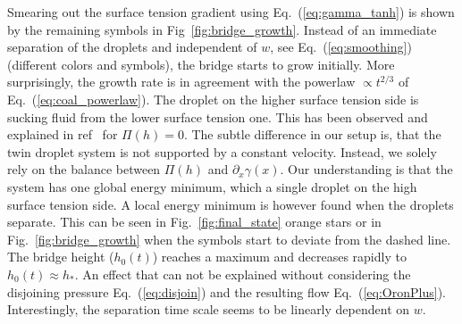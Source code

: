 \documentclass[twocolumn,amsmath,amssymb,showpacs,pre,nofootinbib,superscriptaddress]{revtex4-1} %
\begin{document}
Smearing out the surface tension gradient using Eq.~(\ref{eq:gamma_tanh}) is shown by the remaining symbols in Fig~\ref{fig:bridge_growth}.
Instead of an immediate separation of the droplets and independent of $w$, see Eq.~(\ref{eq:smoothing}) (different colors and symbols), the bridge starts to grow initially.
More surprisingly, the growth rate is in agreement with the powerlaw $\propto t^{2/3}$ of Eq.~(\ref{eq:coal_powerlaw}).
The droplet on the higher surface tension side is sucking fluid from the lower surface tension one.
This has been observed and explained in ref~\cite{PhysRevLett.109.066103} for $\Pi(h) = 0$.
The subtle difference in our setup is, that the twin droplet system is not supported by a constant velocity.
Instead, we solely rely on the balance between $\Pi(h)$ and $\partial_x\gamma(x)$.
Our understanding is that the system has one global energy minimum, which a single droplet on the high surface tension side.
A local energy minimum is however found when the droplets separate.
This can be seen in Fig.~\ref{fig:final_state} orange stars or in Fig.~\ref{fig:bridge_growth} when the symbols start to deviate from the dashed line.
The bridge height ($h_0(t)$) reaches a maximum and decreases rapidly to $h_0(t) \approx h_{\ast}$.
An effect that can not be explained without considering the disjoining pressure Eq.~(\ref{eq:disjoin}) and the resulting flow Eq.~(\ref{eq:OronPlus}).
Interestingly, the separation time scale seems to be linearly dependent on $w$.
\end{document}
